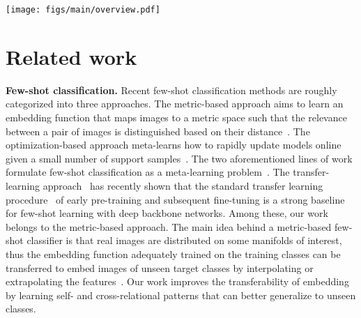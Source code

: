 \documentclass[10pt,twocolumn,letterpaper]{article}
\newcommand{\ours}{RENet\xspace}
\newcommand{\smallbreakparagraph}[1]{\smallbreak \noindent \textbf{#1}}
\begin{document}
\begin{figure*}[t!]
	\centering
	\small
    \texttt{[image: figs/main/overview.pdf]}
	\caption{
	\textbf{Overall architecture of \ours.}
    The base representations,  and , are transformed to self-correlation tensors,  and , which are then updated by the convolutional block  to self-correlational representations,  and , respectively.
    The cross-correlation  is computed between the pair of image representations and then refined by the convolutional block  to , which is bidirectionally aggregated to generate co-attention maps,  and . 
    These co-attention maps are applied to corresponding image representations,  and , and their attended features are aggregated to produce the final relational embeddings,  and , respectively. 
    }
\label{fig:architecture}
\end{figure*}
 \section{Related work}
\smallbreakparagraph{Few-shot classification.}
Recent few-shot classification methods are roughly categorized into three approaches.
The metric-based approach aims to learn an embedding function that maps images to a metric space such that the relevance between a pair of images is distinguished based on their distance~\cite{koch2015siamese, matchingnet, protonet, tadam, allen2019infinite, li2019revisiting, ctm, tewam, can, feat, deepemd, lifchitz2021local, crosstransformers}.
The optimization-based approach meta-learns how to rapidly update models online given a small number of support samples~\cite{maml, bmaml, leo, ravi2016optimization, mtl}.
The two aforementioned lines of work formulate few-shot classification as a meta-learning problem~\cite{schmidhuber1987evolutionary, bengio1990learning, hochreiter2001learning}.
The transfer-learning approach~\cite{closer, rfs, dhillon2019baseline, wang2020few, negmargin, gidaris2018dynamic, qi2018low, rodriguez2020embedding, ziko2020laplacian} has recently shown that the standard transfer learning procedure~\cite{yosinski2014transferable, oquab2014} of early pre-training and subsequent fine-tuning is a strong baseline for few-shot learning with deep backbone networks.
Among these, our work belongs to the metric-based approach.
The main idea behind a metric-based few-shot classifier is that real images are distributed on some manifolds of interest, thus the embedding function adequately trained on the training classes can be transferred to embed images of unseen target classes by interpolating or extrapolating the features~\cite{tenenbaum1998mapping, facenet}.
Our work improves the transferability of embedding by learning self- and cross-relational patterns that can better generalize to unseen classes.
\end{document}
